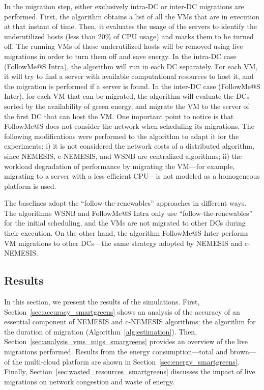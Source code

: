 In the migration step, either exclusively intra-DC or inter-DC migrations are performed. First, the algorithm obtains a list of all the VMs that are in execution at that instant of time. Then, it evaluates the usage of the servers to identify the underutilized hosts (less than 20\% of CPU usage) and marks them to be turned off. The running VMs of these underutilized hosts will be removed using live migrations in order to turn them off and save energy. In the intra-DC case (FollowMe@S Intra), the algorithm will run in each DC separately. For each VM, it will try to find a server with available computational resources to host it, and the migration is performed if a server is found. In the inter-DC case (FollowMe@S Inter), for each VM that can be migrated, the algorithm will evaluate the DCs sorted by the availability of green energy, and migrate the VM to the server of the first DC that can host the VM. One important point to notice is that FollowMe@S does not consider the network when scheduling its migrations. The following modifications were performed to the algorithm to adapt it for the experiments: i) it is not considered the network costs of a distributed algorithm, since NEMESIS, c-NEMESIS, and WSNB are centralized algorithms; ii) the workload degradation of performance by migrating the VM---for example, migrating to a server with a less efficient CPU---is not modeled as a homogeneous platform is used.

The baselines adopt the ``follow-the-renewables'' approaches in different ways. The algorithms WSNB and FollowMe@S Intra only use ``follow-the-renewables'' for the initial scheduling, and the VMs are not migrated to other DCs during their execution. On the other hand, the algorithm FollowMe@S Inter performs VM migrations to other DCs---the same strategy adopted by NEMESIS and c-NEMESIS.



\subsection{Results}

\label{sec:results_smargreens}

In this section, we present the results of the simulations. First, Section~\ref{sec:accuracy_smartgreens} shows an analysis of the accuracy of an essential component of NEMESIS and c-NEMESIS algorithms: the algorithm for the duration of migration (Algorithm~\ref{alg:estimation}). Then, Section~\ref{sec:analysis_vms_migs_smargreens} provides an overview of the live migrations performed. Results from the energy consumption---total and brown---of the multi-cloud platform are shown in Section~\ref{sec:energy_smartgreens}. Finally, Section~\ref{sec:wasted_resources_smartgreens} discusses the impact of live migrations on network congestion and waste of energy.

